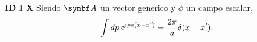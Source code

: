 \documentclass[10pt,oneside]{CBFT_book}
\begin{document}
% 
% 
% 
%  
% 
% 
% 
% 
% 
% 
% 
% 
% 
{\bf ID I X}
Siendo $\vb{A}$ un vector generico y $\phi$ un campo escalar,
\[
	\int dp \:\mathrm{e}^{i p a (x-x')} = \frac{2\pi}{a} \delta(x-x').
\]
% 
% 
% 
\end{document}
